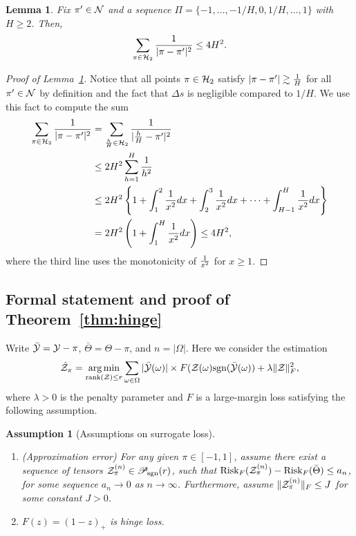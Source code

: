 \documentclass[11pt]{article}
\theoremstyle{plain}
\newtheorem{lem}{Lemma}[section]
\newtheorem{assumption}{Assumption}[section]
\theoremstyle{definition}
\def\sign{\textup{sgn}}
\def\caliP{\mathscr{P}_{\textup{sgn}}}
\def\risk{\textup{Risk}}
\begin{document}
\begin{lem}\label{lem:H}
Fix $\pi'\in\mathcal{N}$ and a sequence $\Pi=\{-1,\ldots,-1/H,0,1/H,\ldots,1\}$ with $H\geq 2$. Then, 
\[
\sum_{\pi \in \mathcal{H}_2}{1\over 
|\pi-\pi'|^2}\leq 4H^2. 
\]
\end{lem}
\begin{proof}[Proof of Lemma~\ref{lem:H}]
Notice that all points $\pi\in\mathcal{H}_2$ satisfy $|\pi-\pi'|\gtrsim{1\over H}$ for all $\pi'\in\mathcal{N}$ by definition and the fact that $\Delta s$ is negligible compared to $1/H$. We use this fact to compute the sum
\begin{align}
   \sum_{\pi \in \mathcal{H}_2}{1\over |\pi-\pi'|^2}&= \sum_{\frac{h}{H}\in\mathcal{H}_2 } {1\over |\frac{h}{H}-\pi'|^2}\\
   &\leq 2H^2\sum_{h=1}^{H}{1 \over h^2}\\
 &\leq 2H^2\left\{ 1+\int_{1}^2{1\over x^2}dx+ \int_{2}^3{1\over x^2}dx+\cdots + \int_{H-1}^H{1\over x^2}dx\right\}\\
&= 2H^2\left(1+\int^{H}_{1}{1\over x^2}dx\right) \leq 4H^2,
\end{align}
 where the third line uses the monotonicity of ${1\over x^2}$ for $x\geq 1$. 
 \end{proof}
 

\subsection{Formal statement and proof of Theorem~\ref{thm:hinge}}\label{sec:hinge}
Write $\bar {\mathcal{Y}}=\mathcal{Y}-\pi$, $\bar \Theta=\Theta-\pi$, and $n=|\Omega|$. Here we consider the estimation 
 \begin{align}\label{eq:largemgopt}
  \hat\tZ_\pi = \argmin_{\text{rank}(\tZ)\leq r}\sum_{\omega\in\Omega} |\bar\tY(\omega)|\times F(\tZ(\omega)\sign(\bar \tY(\omega))+\lambda\FnormSize{}{\tZ}^2,
 \end{align}
 where $\lambda>0$ is the penalty parameter and $F$ is  a large-margin loss satisfying the following assumption.

\begin{assumption}[Assumptions on surrogate loss]\label{ass:main} \hfill
\begin{enumerate}
\item[(a)] (Approximation error) For any given $\pi\in[-1,1]$, assume there exist a sequence of tensors $\tZ^{(n)}_\pi\in\caliP(r)
$, such that $\risk_F(\tZ^{(n)}_\pi)-\risk_F(\bar\Theta)\leq a_n$, for some sequence $a_n\to 0$ as $n\to\infty$. Furthermore, assume $\lVert\mathcal{Z}_{\pi}^{(n)}\rVert_F \leq J$ for some constant $J>0$. 
\item[(b)]  $F(z)=(1-z)_{+}$ is hinge loss.
\end{enumerate}
\end{assumption}
\end{document}
